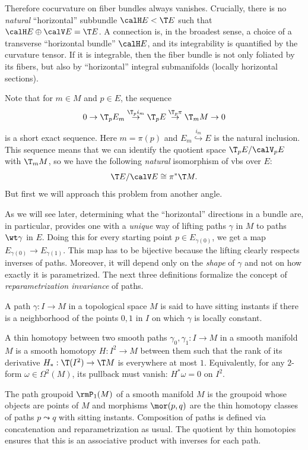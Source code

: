 Therefore cocurvature on fiber bundles always vanishes. Crucially, there is no \emph{natural} ``horizontal'' subbundle $\calH E<\T E$ such that $\calH E\oplus \calV E=\T E$. A connection is, in the broadest sense, a choice of a transverse ``horizontal bundle'' $\calH E$, and its integrability is quantified by the curvature tensor. If it is integrable, then the fiber bundle is not only foliated by its fibers, but also by ``horizontal''  integral submanifolds (locally horizontal sections).

Note that for $m\in M$ and $p\in E$, the sequence
\[0\to \T_p E_m\overset{\T_p i_m}{\to}\T_p E\overset{\T_p\pi}{\to}\T_mM\to 0\]
is a short exact sequence. Here $m=\pi(p)$ and $E_m\overset{i_m}{\hookrightarrow} E$ is the natural inclusion. This sequence means that we can identify the quotient space $\T_pE\slash \calV_pE$ with $\T_mM$, so we have the following \emph{natural} isomorphism of \glspl{vb} over $E$:
\[\T E\slash \calV E\cong \pi^\ast \T M.\]
But first we will approach this problem from another angle.

As we will see later, determining what the ``horizontal'' directions in a bundle are, in particular, provides one with a \emph{unique} way of lifting paths $\gamma$ in $M$ to paths $\wt\gamma$ in $E$. Doing this for every starting point $p\in E_{\gamma(0)}$, we get a map $E_{\gamma(0)}\to E_{\gamma(1)}$. This map has to be bijective because the lifting clearly respects inverses of paths. Moreover, it will depend only on the \emph{shape} of $\gamma$ and not on how exactly it is parametrized. The next three definitions formalize the concept of \emph{reparametrization invariance} of paths.

\begin{defn}
    A path $\gamma:I\to M$ in a topological space $M$ is said to have sitting instants if there is a neighborhood of the points $0,1$ in $I$ on which $\gamma$ is locally constant.
\end{defn}

\begin{defn}
    A thin homotopy between two smooth paths $\gamma_0,\gamma_1:I\to M$ in a smooth manifold $M$ is a smooth homotopy $H:I^2\to M$ between them such that the rank of its derivative $H_\ast:\T(I^2)\to \T M$ is everywhere at most $1$. Equivalently, for any $2$-form $\omega\in\Omega^2(M)$, its pullback must vanish: $H^\ast \omega=0$ on $I^2$.
\end{defn}

\begin{defn}
    The path groupoid $\rmP_1(M)$ of a smooth manifold $M$ is the groupoid whose objects are points of $M$ and morphisms $\mor(p,q)$ are the thin homotopy classes of paths $p\leadsto q$ with sitting instants. Composition of paths is defined via concatenation and reparametrization as usual. The quotient by thin homotopies ensures that this is an associative product with inverses for each path.
\end{defn}

